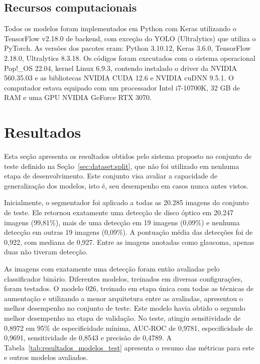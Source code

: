 \documentclass[12pt]{article}
\begin{document}
\subsection{Recursos computacionais}
\label{sec:resources}

Todos os modelos foram implementados em Python com Keras utilizando o TensorFlow v2.18.0 de backend, com exceção do YOLO (Ultralytics) que utiliza o PyTorch. As versões dos pacotes eram: Python 3.10.12, Keras 3.6.0, TensorFlow 2.18.0, Ultralytics 8.3.18.
Os códigos foram executados com o sistema operacional Pop!\_OS 22.04, kernel Linux 6.9.3, contendo instalado o driver da NVIDIA 560.35.03 e as bibliotecas NVIDIA CUDA 12.6 e NVIDIA cuDNN 9.5.1.
O computador estava equipado com um processador Intel i7-10700K, 32 GB de RAM e uma GPU NVIDIA GeForce RTX 3070.

\section{Resultados}
\label{sec:results}

Esta seção apresenta os resultados obtidos pelo sistema proposto no conjunto de teste definido na Seção~\ref{sec:dataset:split}, que não foi utilizado em nenhuma etapa de desenvolvimento. Este conjunto visa avaliar a capacidade de generalização dos modelos, isto é, seu desempenho em casos nunca antes vistos.

%

Inicialmente, o segmentador foi aplicado a todas as 20.285 imagens do conjunto de teste. Ele retornou exatamente uma detecção de disco óptico em 20.247 imagens (99,81\%), mais de uma detecção em 19 imagens (0,09\%) e nenhuma detecção em outras 19 imagens (0,09\%). A pontuação média das detecções foi de 0,922, com mediana de 0,927. Entre as imagens anotadas como glaucoma, apenas duas não tiveram detecção.

As imagens com exatamente uma detecção foram então avaliadas pelo classificador binário. Diferentes modelos, treinados em diversas configurações, foram testados. O modelo 026, treinado em etapa única com todas as técnicas de aumentação e utilizando a menor arquitetura entre as avaliadas, apresentou o melhor desempenho no conjunto de teste. Este modelo havia obtido o segundo melhor desempenho na etapa de validação. No teste, atingiu sensitividade de 0,8972 em 95\% de especificidade mínima, AUC-ROC de 0,9781, especificidade de 0,9691, sensitividade de 0,8543 e precisão de 0,4789. A Tabela~\ref{tab:resultados_modelos_test} apresenta o resumo das métricas para este e outros modelos avaliados.
\end{document}
